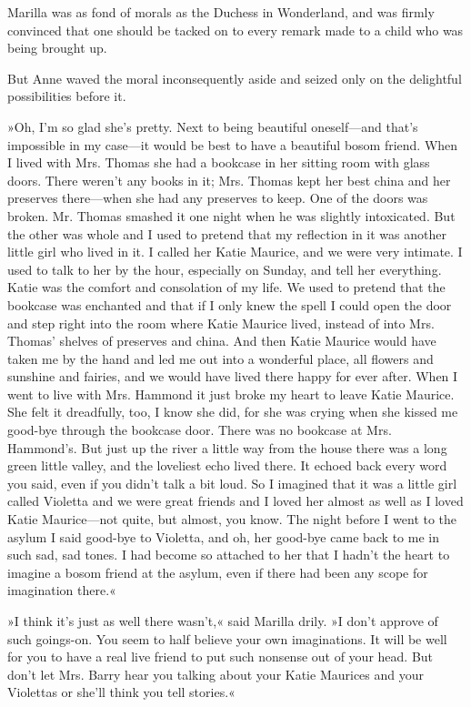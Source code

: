 Marilla was as fond of morals as the Duchess in Wonderland, and was firmly convinced that one should be tacked on to every remark made to a child who was being brought up.

But Anne waved the moral inconsequently aside and seized only on the delightful possibilities before it.

»Oh, I’m so glad she’s pretty. Next to being beautiful oneself—and that’s impossible in my case—it would be best to have a beautiful bosom friend. When I lived with Mrs. Thomas she had a bookcase in her sitting room with glass doors. There weren’t any books in it; Mrs. Thomas kept her best china and her preserves there—when she had any preserves to keep. One of the doors was broken. Mr. Thomas smashed it one night when he was slightly intoxicated. But the other was whole and I used to pretend that my reflection in it was another little girl who lived in it. I called her Katie Maurice, and we were very intimate. I used to talk to her by the hour, especially on Sunday, and tell her everything. Katie was the comfort and consolation of my life. We used to pretend that the bookcase was enchanted and that if I only knew the spell I could open the door and step right into the room where Katie Maurice lived, instead of into Mrs. Thomas’ shelves of preserves and china. And then Katie Maurice would have taken me by the hand and led me out into a wonderful place, all flowers and sunshine and fairies, and we would have lived there happy for ever after. When I went to live with Mrs. Hammond it just broke my heart to leave Katie Maurice. She felt it dreadfully, too, I know she did, for she was crying when she kissed me good-bye through the bookcase door. There was no bookcase at Mrs. Hammond’s. But just up the river a little way from the house there was a long green little valley, and the loveliest echo lived there. It echoed back every word you said, even if you didn’t talk a bit loud. So I imagined that it was a little girl called Violetta and we were great friends and I loved her almost as well as I loved Katie Maurice—not quite, but almost, you know. The night before I went to the asylum I said good-bye to Violetta, and oh, her good-bye came back to me in such sad, sad tones. I had become so attached to her that I hadn’t the heart to imagine a bosom friend at the asylum, even if there had been any scope for imagination there.«

»I think it’s just as well there wasn’t,« said Marilla drily. »I don’t approve of such goings-on. You seem to half believe your own imaginations. It will be well for you to have a real live friend to put such nonsense out of your head. But don’t let Mrs. Barry hear you talking about your Katie Maurices and your Violettas or she’ll think you tell stories.«


